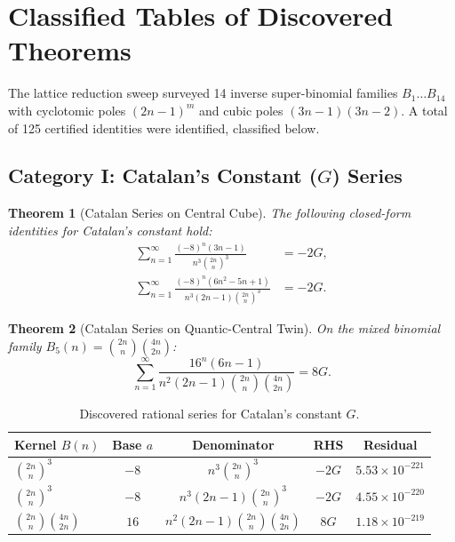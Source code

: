 \documentclass[11pt,a4paper]{article}
\newtheorem{theorem}{Theorem}[section]
\theoremstyle{definition}
\begin{document}
\section{Classified Tables of Discovered Theorems}

The lattice reduction sweep surveyed 14 inverse super-binomial families $B_1 \dots B_{14}$ with cyclotomic poles $(2n-1)^m$ and cubic poles $(3n-1)(3n-2)$. A total of 125 certified identities were identified, classified below.

\subsection{Category I: Catalan's Constant ($G$) Series}

\begin{theorem}[Catalan Series on Central Cube]
The following closed-form identities for Catalan's constant hold:
\begin{align}
\sum_{n=1}^\infty \frac{(-8)^n \left( 3n - 1 \right)}{n^3 \binom{2n}{n}^3} &= -2 G, \label{eq:cat_1} \\
\sum_{n=1}^\infty \frac{(-8)^n \left( 6n^2 - 5n + 1 \right)}{n^3 (2n-1) \binom{2n}{n}^3} &= -2 G. \label{eq:cat_2}
\end{align}
\end{theorem}

\begin{theorem}[Catalan Series on Quantic-Central Twin]
On the mixed binomial family $B_5(n) = \binom{2n}{n}\binom{4n}{2n}$:
\begin{equation}\label{eq:cat_3}
\sum_{n=1}^\infty \frac{16^n \left( 6n - 1 \right)}{n^2 (2n-1) \binom{2n}{n} \binom{4n}{2n}} = 8 G.
\end{equation}
\end{theorem}

\begin{table}[h!]
\centering
\small
\begin{tabular}{lcccc}
\toprule
\textbf{Kernel $B(n)$} & \textbf{Base $a$} & \textbf{Denominator} & \textbf{RHS} & \textbf{Residual} \\
\midrule
$\binom{2n}{n}^3$ & $-8$ & $n^3 \binom{2n}{n}^3$ & $-2G$ & $5.53 \times 10^{-221}$ \\
$\binom{2n}{n}^3$ & $-8$ & $n^3(2n-1)\binom{2n}{n}^3$ & $-2G$ & $4.55 \times 10^{-220}$ \\
$\binom{2n}{n}\binom{4n}{2n}$ & $16$ & $n^2(2n-1)\binom{2n}{n}\binom{4n}{2n}$ & $8G$ & $1.18 \times 10^{-219}$ \\
\bottomrule
\end{tabular}
\caption{Discovered rational series for Catalan's constant $G$.}
\label{tab:catalan}
\end{table}
\end{document}
